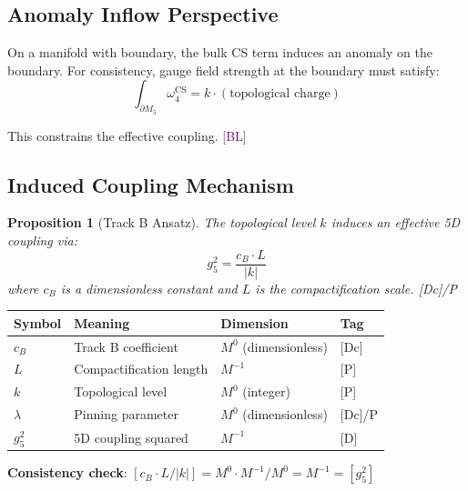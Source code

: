 \documentclass[11pt,a4paper]{article}
\newtheorem{proposition}[theorem]{Proposition}
\newcommand{\tagD}{\textcolor{blue!70!black}{[D]}}
\newcommand{\tagDc}{\textcolor{blue!50!black}{[Dc]}}
\newcommand{\tagP}{\textcolor{green!50!black}{[P]}}
\newcommand{\tagBL}{\textcolor{purple}{[BL]}}
\begin{document}
\subsection{Anomaly Inflow Perspective}

On a manifold with boundary, the bulk CS term induces an anomaly on the boundary.
For consistency, gauge field strength at the boundary must satisfy:
\begin{equation}
\label{eq:anomaly-inflow}
\int_{\partial M_5} \omega_4^{\text{CS}} = k \cdot (\text{topological charge})
\end{equation}

This constrains the effective coupling. \tagBL

\subsection{Induced Coupling Mechanism}

\begin{proposition}[Track B Ansatz]
\label{prop:track-b}
The topological level $k$ induces an effective 5D coupling via:
\begin{equation}
\label{eq:track-b-ansatz}
g_5^2 = \frac{c_B \cdot L}{|k|}
\end{equation}
where $c_B$ is a dimensionless constant and $L$ is the compactification scale.
\tagDc/P
\end{proposition}

\begin{resultbox}
\begin{center}
\begin{tabular}{llll}
\toprule
\textbf{Symbol} & \textbf{Meaning} & \textbf{Dimension} & \textbf{Tag} \\
\midrule
$c_B$ & Track B coefficient & $M^0$ (dimensionless) & \tagDc \\
$L$ & Compactification length & $M^{-1}$ & \tagP \\
$k$ & Topological level & $M^0$ (integer) & \tagP \\
$\lambda$ & Pinning parameter & $M^0$ (dimensionless) & \tagDc/P \\
$g_5^2$ & 5D coupling squared & $M^{-1}$ & \tagD \\
\bottomrule
\end{tabular}
\end{center}
\textbf{Consistency check}: $[c_B \cdot L / |k|] = M^0 \cdot M^{-1} / M^0 = M^{-1} = [g_5^2]$ \checkmark
\end{resultbox}
\end{document}
